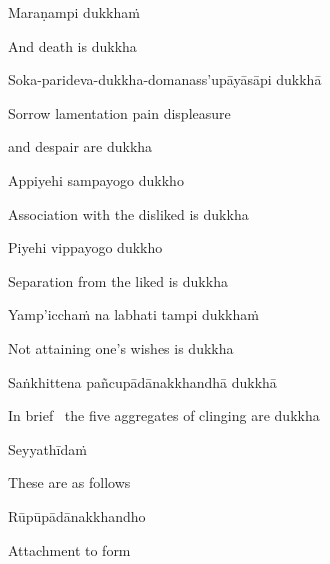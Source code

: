 Maraṇampi dukkhaṁ

\begin{english}
  And death is dukkha
\end{english}

Soka-parideva-dukkha-domanass'upāyāsāpi dukkhā

\begin{english}
    Sorrow lamentation pain displeasure\makeatletter\hyperlink{endnote14-appendix}\makeatother

  and despair are dukkha
\end{english}

Appiyehi sampayogo dukkho

\begin{english}
  Association with the disliked is dukkha
\end{english}

Piyehi vippayogo dukkho

\begin{english}
  Separation from the liked is dukkha
\end{english}

Yamp'icchaṁ na labhati tampi dukkhaṁ

\begin{english}
  Not attaining one's wishes is dukkha
\end{english}

Saṅkhittena pañcupādānakkhandhā dukkhā

\begin{english}
    In brief \breathmark\ the five aggregates of clinging are dukkha\makeatletter\hyperlink{endnote15-appendix}\makeatother

\end{english}

Seyyathīdaṁ

\begin{english}
  These are as follows
\end{english}

Rūpūpādānakkhandho

\begin{english}
  Attachment to form
\end{english}

